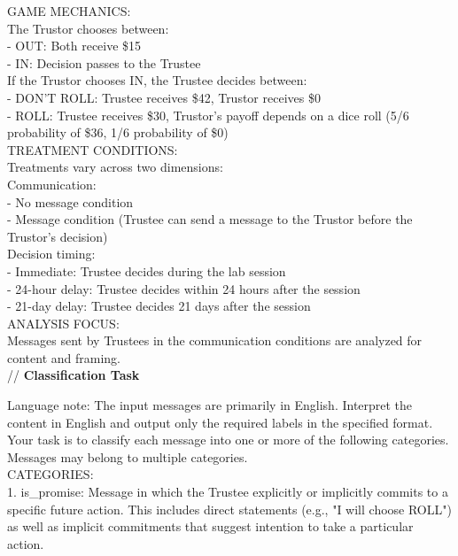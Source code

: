 \documentclass[11pt]{article}
\begin{document}
\begin{sloppypar}
\begin{appendices}
\begin{tcolorbox}
GAME MECHANICS:\\
The Trustor chooses between:\\
- OUT: Both receive \$15\\
- IN: Decision passes to the Trustee\\

If the Trustor chooses IN, the Trustee decides between:\\
- DON'T ROLL: Trustee receives \$42, Trustor receives \$0\\
- ROLL: Trustee receives \$30, Trustor's payoff depends on a dice roll (5/6 probability of \$36, 1/6 probability of \$0)\\

TREATMENT CONDITIONS:\\
Treatments vary across two dimensions:\\

Communication:\\
- No message condition\\
- Message condition (Trustee can send a message to the Trustor before the Trustor's decision)\\

Decision timing:\\
- Immediate: Trustee decides during the lab session\\
- 24-hour delay: Trustee decides within 24 hours after the session\\
- 21-day delay: Trustee decides 21 days after the session\\

ANALYSIS FOCUS:\\
Messages sent by Trustees in the communication conditions are analyzed for content and framing.\\

// \textbf{Classification Task}

Language note: The input messages are primarily in English. Interpret the content in English and output only the required labels in the specified format.\\

Your task is to classify each message into one or more of the following categories. Messages may belong to multiple categories.\\

CATEGORIES:\\

1. is\_promise: Message in which the Trustee explicitly or implicitly commits to a specific future action. This includes direct statements (e.g., "I will choose ROLL") as well as implicit commitments that suggest intention to take a particular action.\\


\end{tcolorbox}
\end{appendices}
\end{sloppypar}
\end{document}
